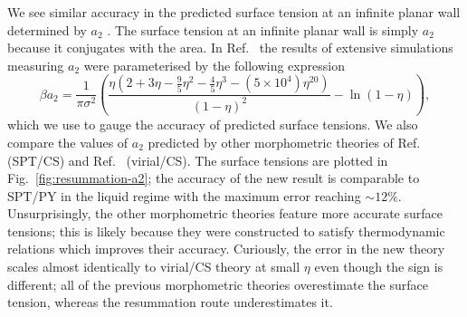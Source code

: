 \documentclass[11pt,twoside]{report}
\begin{document}
We see similar accuracy in the predicted surface tension at an infinite planar wall determined by $a_2$
.
The surface tension at an infinite planar wall is simply $a_2$ because it conjugates with the area.
In Ref.\ \cite{DavidchackMP2015} the results of extensive simulations measuring $a_2$ were parameterised by the following expression
\begin{equation}\label{eq:quasi-exact-surface-tension}
  \beta a_2
  =
  \frac{1}{\pi \sigma^2} \left(
  \frac{\eta (2 + 3\eta - \frac{9}{5}\eta^2 - \frac{4}{5}\eta^3 - (5 \times 10^4) \eta^{20})}{(1 - \eta)^2}
  - \ln{(1 - \eta)}
  \right),
\end{equation}
which we use to gauge the accuracy of predicted surface tensions.
We also compare the values of $a_2$ predicted by other morphometric theories of Ref.\ \cite{Hansen-GoosJPCM2006} (SPT/CS) and Ref.\ \cite{Robinson?2019} (virial/CS).
The surface tensions are plotted in Fig.\ \ref{fig:resummation-a2}; the accuracy of the new result is comparable to SPT/PY in the liquid regime with the maximum error reaching $\sim12\%$.
Unsurprisingly, the other morphometric theories feature more accurate surface tensions; this is likely because they were constructed to satisfy thermodynamic relations which improves their accuracy.
Curiously, the error in the new theory scales almost identically to virial/CS theory at small $\eta$ even though the sign is different; all of the previous morphometric theories overestimate the surface tension, whereas the resummation route underestimates it.
\end{document}
